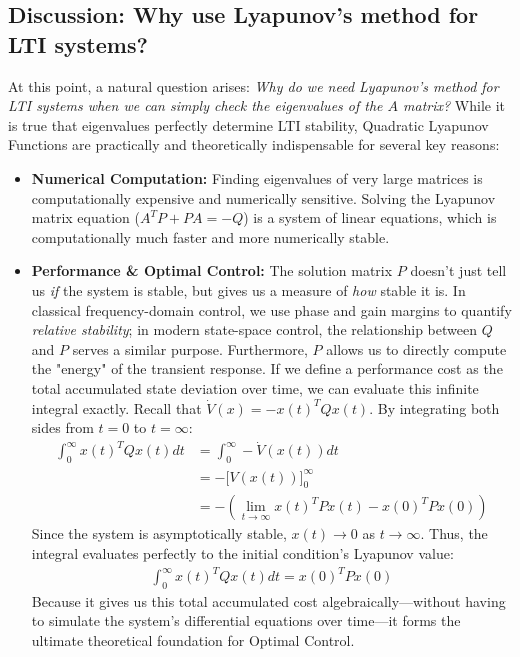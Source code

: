 \documentclass[twoside, 11pt]{article}
\begin{document}
\subsection*{Discussion: Why use Lyapunov's method for LTI systems?}

At this point, a natural question arises: \textit{Why do we need Lyapunov's method for LTI systems when we can simply check the eigenvalues of the $A$ matrix?} 
While it is true that eigenvalues perfectly determine LTI stability, Quadratic Lyapunov Functions are practically and theoretically indispensable for several key reasons:
\begin{itemize}
    \item \textbf{Numerical Computation:} Finding eigenvalues of very large matrices is computationally expensive and numerically sensitive. Solving the Lyapunov matrix equation ($A^T P + PA = -Q$) is a system of linear equations, which is computationally much faster and more numerically stable.
    \item \textbf{Performance \& Optimal Control:} The solution matrix $P$ doesn't just tell us \textit{if} the system is stable, but gives us a measure of \textit{how} stable it is. In classical frequency-domain control, we use phase and gain margins to quantify \textit{relative stability}; in modern state-space control, the relationship between $Q$ and $P$ serves a similar purpose. Furthermore, $P$ allows us to directly compute the "energy" of the transient response. If we define a performance cost as the total accumulated state deviation over time, we can evaluate this infinite integral exactly. Recall that $\dot{V}(x) = -x(t)^T Q x(t)$. By integrating both sides from $t=0$ to $t=\infty$:
%
\begin{align*}
    \int_{0}^{\infty} x(t)^T Q x(t) dt &= \int_{0}^{\infty} -\dot{V}(x(t)) dt \\
    &= - \Big[ V(x(t)) \Big]_{0}^{\infty} \\
    &= - \left( \lim_{t \to \infty} x(t)^T P x(t) - x(0)^T P x(0) \right)
\end{align*}
%
    Since the system is asymptotically stable, $x(t) \to 0$ as $t \to \infty$. Thus, the integral evaluates perfectly to the initial condition's Lyapunov value:
%
\begin{align*}
    \int_{0}^{\infty} x(t)^T Q x(t) dt = x(0)^T P x(0)
\end{align*}
%
    Because it gives us this total accumulated cost algebraically---without having to simulate the system's differential equations over time---it forms the ultimate theoretical foundation for Optimal Control.

\end{itemize}
\end{document}
